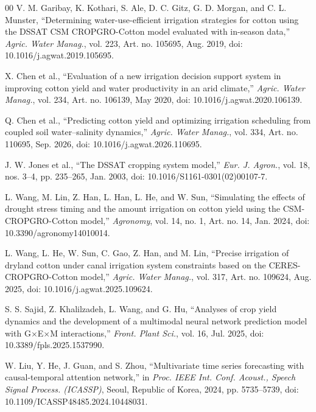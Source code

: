 \documentclass{article}
\begin{document}
\begin{thebibliography}{00}
V. M. Garibay, K. Kothari, S. Ale, D. C. Gitz, G. D. Morgan, and C. L. Munster, ``Determining water-use-efficient irrigation strategies for cotton using the DSSAT CSM CROPGRO-Cotton model evaluated with in-season data,'' \emph{Agric. Water Manag.}, vol. 223, Art. no. 105695, Aug. 2019, doi: 10.1016/j.agwat.2019.105695.

X. Chen et al., ``Evaluation of a new irrigation decision support system in improving cotton yield and water productivity in an arid climate,'' \emph{Agric. Water Manag.}, vol. 234, Art. no. 106139, May 2020, doi: 10.1016/j.agwat.2020.106139.

Q. Chen et al., ``Predicting cotton yield and optimizing irrigation scheduling from coupled soil water--salinity dynamics,'' \emph{Agric. Water Manag.}, vol. 334, Art. no. 110695, Sep. 2026, doi: 10.1016/j.agwat.2026.110695.

J. W. Jones et al., ``The DSSAT cropping system model,'' \emph{Eur. J. Agron.}, vol. 18, nos. 3--4, pp. 235--265, Jan. 2003, doi: 10.1016/S1161-0301(02)00107-7.

L. Wang, M. Lin, Z. Han, L. Han, L. He, and W. Sun, ``Simulating the effects of drought stress timing and the amount irrigation on cotton yield using the CSM-CROPGRO-Cotton model,'' \emph{Agronomy}, vol. 14, no. 1, Art. no. 14, Jan. 2024, doi: 10.3390/agronomy14010014.

L. Wang, L. He, W. Sun, C. Gao, Z. Han, and M. Lin, ``Precise irrigation of dryland cotton under canal irrigation system constraints based on the CERES-CROPGRO-Cotton model,'' \emph{Agric. Water Manag.}, vol. 317, Art. no. 109624, Aug. 2025, doi: 10.1016/j.agwat.2025.109624.

S. S. Sajid, Z. Khalilzadeh, L. Wang, and G. Hu, ``Analyses of crop yield dynamics and the development of a multimodal neural network prediction model with G$\times$E$\times$M interactions,'' \emph{Front. Plant Sci.}, vol. 16, Jul. 2025, doi: 10.3389/fpls.2025.1537990.

W. Liu, Y. He, J. Guan, and S. Zhou, ``Multivariate time series forecasting with causal-temporal attention network,'' in \emph{Proc. IEEE Int. Conf. Acoust., Speech Signal Process. (ICASSP)}, Seoul, Republic of Korea, 2024, pp. 5735--5739, doi: 10.1109/ICASSP48485.2024.10448031.


\end{thebibliography}
\end{document}
